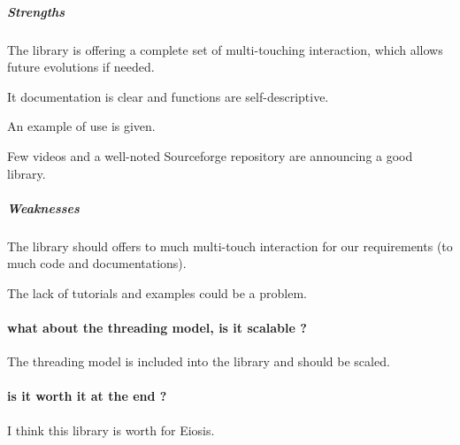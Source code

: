 \subparagraph*{Strengths}

The library is offering a complete set of multi-touching interaction, which allows future evolutions if needed.

It documentation is clear and functions are self-descriptive.

An example of use is given.

Few videos and a well-noted Sourceforge repository are announcing a good library.

\subparagraph*{Weaknesses}

The library should offers to much multi-touch interaction for our requirements (to much code and documentations).

The lack of tutorials and examples could be a problem.


\paragraph*{what about the threading model, is it scalable ?}

The threading model is included into the library and should be scaled.

\paragraph*{is it worth it at the end ?}

I think this library is worth for Eiosis.
